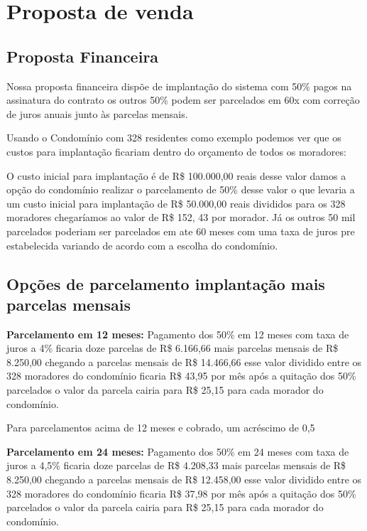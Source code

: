 \chapter{Proposta de venda}
\label{ch:identificador}

\section{Proposta Financeira}
Nossa proposta financeira dispõe de implantação do sistema com 50\% pagos na assinatura do contrato os outros 50\% podem ser parcelados em 60x com correção de juros anuais junto às parcelas mensais.

Usando o Condomínio com 328 residentes como exemplo podemos ver que os custos para implantação ficariam dentro do orçamento de todos os moradores:

O custo inicial para implantação é de R\$ 100.000,00 reais desse valor damos a opção do condomínio realizar o parcelamento de 50\% desse valor o que levaria a um custo inicial para implantação de R\$ 50.000,00 reais divididos para os 328 moradores chegaríamos ao valor de R\$ 152, 43 por morador. Já os outros 50 mil parcelados poderiam ser parcelados em ate 60 meses com uma taxa de juros pre estabelecida variando de acordo com a escolha do condomínio.

\section{Opções de parcelamento implantação mais parcelas mensais}

\textbf{Parcelamento em 12 meses:}
Pagamento dos 50\% em 12 meses com taxa de juros a 4\% ficaria doze parcelas de R\$ 6.166,66 mais parcelas mensais de R\$ 8.250,00 chegando a parcelas mensais de R\$ 14.466,66 esse valor dividido entre os 328 moradores do condomínio ficaria R\$ 43,95 por mês após a quitação dos 50\% parcelados o valor da parcela cairia para R\$ 25,15 para cada morador do condomínio.

Para parcelamentos acima de 12 meses e cobrado, um acréscimo de 0,5%

\textbf{Parcelamento em 24 meses:}
Pagamento dos 50\% em 24 meses com taxa de juros a 4,5\% ficaria doze parcelas de R\$ 4.208,33 mais parcelas mensais de R\$ 8.250,00 chegando a parcelas mensais de R\$ 12.458,00 esse valor dividido entre os 328 moradores do condomínio ficaria R\$ 37,98 por mês após a quitação dos 50\% parcelados o valor da parcela cairia para R\$ 25,15 para cada morador do condomínio.

